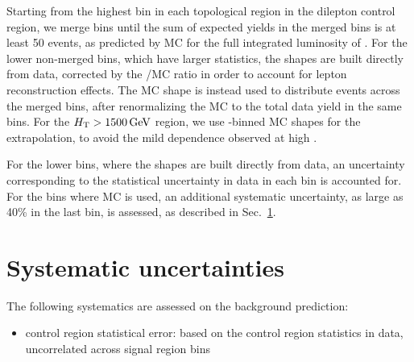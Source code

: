 Starting from the highest \mttwo bin in each topological region in the dilepton control region,
we merge bins until the sum of expected yields in the merged bins is at least 50 events, 
as predicted by MC for the full integrated luminosity of \Lint.
For the lower non-merged \mttwo bins, which have larger statistics, the \mttwo shapes are built
directly from \zll data, corrected by the \znunu/\zll MC ratio in order to account
for lepton reconstruction effects. The \znunu MC \mttwo shape is instead used to distribute
events across the merged \mttwo bins, after renormalizing the MC to the total data yield in
the same bins. For the $H_{\mathrm{T}}>1500\,\text{Ge\hspace{-.08em}V}$ region, we use \Nj-binned \znunu MC shapes for 
the extrapolation, to avoid the mild \Nj dependence observed at high \mttwo.

For the lower \mttwo bins, where the \mttwo shapes are built directly from \zll data, an
uncertainty corresponding to the statistical uncertainty in data in each \mttwo bin is accounted for.
For the bins where \znunu MC is used, an additional systematic uncertainty, as large as 40\%
in the last \mttwo bin, is assessed, as described in Sec.~\ref{sec:zinv_syst}.


\section{Systematic uncertainties}
\label{sec:zinv_syst}

The following systematics are assessed on the \znunu background prediction:
\begin{itemize}\setlength\itemsep{0mm}
\item control region statistical error: based on the \zll control region statistics in data,
uncorrelated across signal region bins
\end{itemize}
